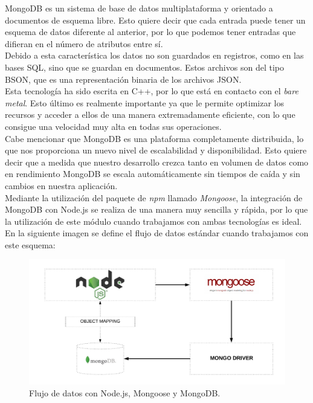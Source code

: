 MongoDB es un sistema de base de datos multiplataforma y orientado a documentos de esquema libre.
Esto quiere decir que cada entrada puede tener un esquema de datos diferente al anterior, por
lo que podemos tener entradas que difieran en el número de atributos entre sí.\\

Debido a esta característica los datos no son guardados en registros, como en las bases SQL, 
sino que se guardan en documentos. Estos archivos son del tipo BSON, que es una representación
binaria de los archivos JSON.\\

Esta tecnología ha sido escrita en C++, por lo que está en contacto con el \textit{bare metal}. Esto
último es realmente importante ya que le permite optimizar los recursos y acceder a ellos de una 
manera extremadamente eficiente, con lo que consigue una velocidad muy alta en todas sus operaciones.\\

Cabe mencionar que MongoDB es una plataforma completamente distribuida, lo que nos proporciona 
un nuevo nivel de escalabilidad y disponibilidad. Esto quiere decir que a medida que nuestro desarrollo
crezca tanto en volumen de datos como en rendimiento MongoDB se escala automáticamente sin tiempos
de caída y sin cambios en nuestra aplicación.\\

Mediante la utilización del paquete de \textit{npm} llamado \textit{Mongoose}\cite{mongoose}, la integración de MongoDB
con Node.js se realiza de una manera muy sencilla y rápida, por lo que la utilización de este módulo
cuando trabajamos con ambas tecnologías es ideal. En la siguiente imagen se define el flujo de datos
estándar cuando trabajamos con este esquema:

\begin{figure}[H]
	\centering
	\includegraphics[scale=0.28]{imagenes/node-mongo.PNG}
	\caption{Flujo de datos con Node.js, Mongoose y MongoDB. \label{fig:figura5}}
\end{figure}


